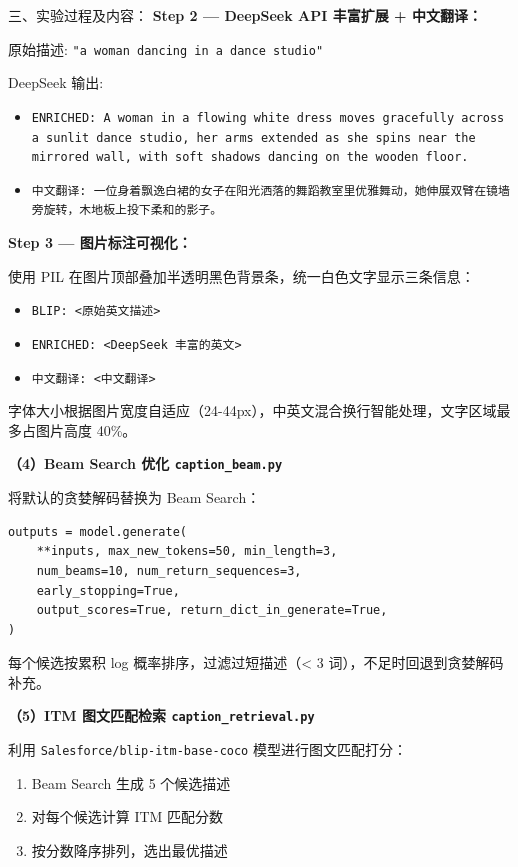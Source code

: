 \documentclass[12pt, a4paper]{article}
\begin{document}
\begin{labbox}{三、实验过程及内容：}{}
\noindent \textbf{Step 2 — DeepSeek API 丰富扩展 + 中文翻译：}

原始描述: \texttt{"a woman dancing in a dance studio"}

DeepSeek 输出:
\begin{itemize}[leftmargin=2em, itemsep=0.2em]
    \item \texttt{ENRICHED: A woman in a flowing white dress moves gracefully across a sunlit dance studio, her arms extended as she spins near the mirrored wall, with soft shadows dancing on the wooden floor.}
    \item \texttt{中文翻译: 一位身着飘逸白裙的女子在阳光洒落的舞蹈教室里优雅舞动，她伸展双臂在镜墙旁旋转，木地板上投下柔和的影子。}
\end{itemize}

\noindent \textbf{Step 3 — 图片标注可视化：}

使用 PIL 在图片顶部叠加半透明黑色背景条，统一白色文字显示三条信息：
\begin{itemize}[leftmargin=2em, itemsep=0.2em]
    \item \texttt{BLIP: <原始英文描述>}
    \item \texttt{ENRICHED: <DeepSeek 丰富的英文>}
    \item \texttt{中文翻译: <中文翻译>}
\end{itemize}
字体大小根据图片宽度自适应（24-44px），中英文混合换行智能处理，文字区域最多占图片高度 40\%。

\vspace{0.3cm}
\textbf{（4）Beam Search 优化 \texttt{caption\_beam.py}}

将默认的贪婪解码替换为 Beam Search：

\begin{lstlisting}
outputs = model.generate(
    **inputs, max_new_tokens=50, min_length=3,
    num_beams=10, num_return_sequences=3,
    early_stopping=True,
    output_scores=True, return_dict_in_generate=True,
)
\end{lstlisting}

每个候选按累积 log 概率排序，过滤过短描述（< 3 词），不足时回退到贪婪解码补充。

\vspace{0.3cm}
\textbf{（5）ITM 图文匹配检索 \texttt{caption\_retrieval.py}}

利用 \texttt{Salesforce/blip-itm-base-coco} 模型进行图文匹配打分：
\begin{enumerate}[leftmargin=2em, itemsep=0.2em]
    \item Beam Search 生成 5 个候选描述
    \item 对每个候选计算 ITM 匹配分数
    \item 按分数降序排列，选出最优描述
\end{enumerate}


\end{labbox}
\end{document}
